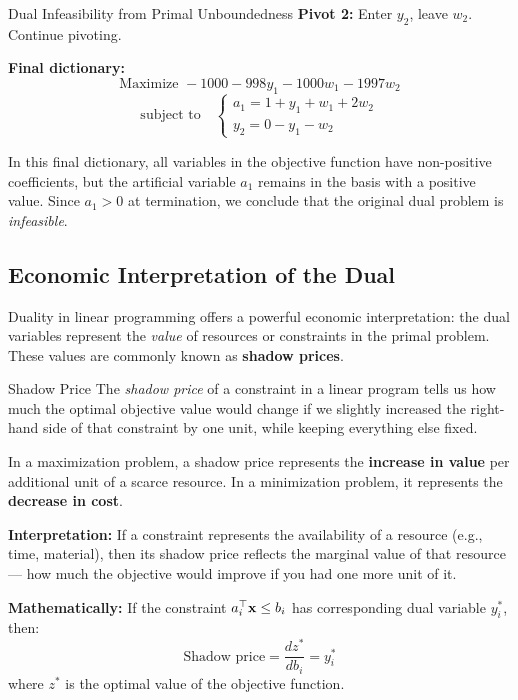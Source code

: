 \begin{example}{Dual Infeasibility from Primal Unboundedness}{}
\textbf{Pivot 2:} Enter \( y_2 \), leave \( w_2 \). Continue pivoting.

\textbf{Final dictionary:}
\[
\text{Maximize } -1000 - 998y_1 - 1000w_1 - 1997w_2
\]
\[
\text{subject to} \quad
\begin{cases}
a_1 = 1 + y_1 + w_1 + 2w_2 \\
y_2 = 0 - y_1 - w_2
\end{cases}
\]

In this final dictionary, all variables in the objective function have non-positive coefficients, but the artificial variable \( a_1 \) remains in the basis with a positive value. Since \( a_1 > 0 \) at termination, we conclude that the original dual problem is \emph{infeasible}.



\end{example}


\subsection{Economic Interpretation of the Dual}

Duality in linear programming offers a powerful economic interpretation: the dual variables represent the \emph{value} of resources or constraints in the primal problem. These values are commonly known as \textbf{shadow prices}.

\vspace{1em}
\begin{definition}{Shadow Price}{}
The \emph{shadow price} of a constraint in a linear program tells us how much the optimal objective value would change if we slightly increased the right-hand side of that constraint by one unit, while keeping everything else fixed.

\smallskip
In a maximization problem, a shadow price represents the \textbf{increase in value} per additional unit of a scarce resource. In a minimization problem, it represents the \textbf{decrease in cost}.

\smallskip
\textbf{Interpretation:}  
If a constraint represents the availability of a resource (e.g., time, material), then its shadow price reflects the marginal value of that resource — how much the objective would improve if you had one more unit of it.

\smallskip
\textbf{Mathematically:}  
If the constraint \( a_i^\top \mathbf{x} \leq b_i \) has corresponding dual variable \( y_i^* \), then:
\[
\text{Shadow price} = \frac{d z^*}{d b_i} = y_i^*
\]
where \( z^* \) is the optimal value of the objective function.
\end{definition}

